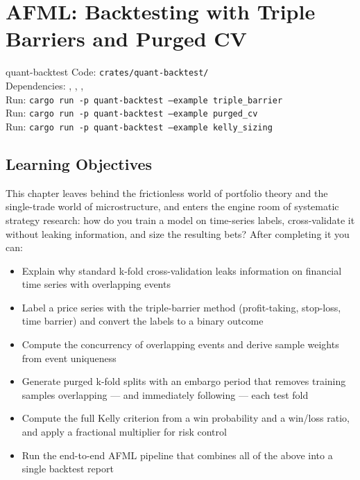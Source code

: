 \chapter{AFML: Backtesting with Triple Barriers and Purged CV}
\label{ch:afml}

\begin{companioncode}{quant-backtest}
Code: \texttt{crates/quant-backtest/}\\
Dependencies: , , , \\
Run: \texttt{cargo run -p quant-backtest --example triple\_barrier}\\
Run: \texttt{cargo run -p quant-backtest --example purged\_cv}\\
Run: \texttt{cargo run -p quant-backtest --example kelly\_sizing}
\end{companioncode}

\section{Learning Objectives}

This chapter leaves behind the frictionless world of portfolio theory
and the single-trade world of microstructure, and enters the engine
room of systematic strategy research: how do you train a model on
time-series labels, cross-validate it without leaking information, and
size the resulting bets? After completing it you can:

\begin{itemize}
    \item Explain why standard k-fold cross-validation leaks
      information on financial time series with overlapping events
    \item Label a price series with the triple-barrier method
      (profit-taking, stop-loss, time barrier) and convert the labels
      to a binary outcome
    \item Compute the concurrency of overlapping events and derive
      sample weights from event uniqueness
    \item Generate purged k-fold splits with an embargo period that
      removes training samples overlapping --- and immediately
      following --- each test fold
    \item Compute the full Kelly criterion from a win probability and
      a win/loss ratio, and apply a fractional multiplier for risk
      control
    \item Run the end-to-end AFML pipeline that combines all of the
      above into a single backtest report
\end{itemize}

